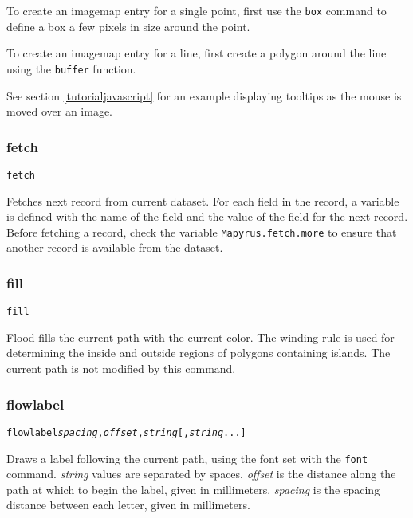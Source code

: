 To create an imagemap entry for a single point, first use the \texttt{box}
command to define a box a few pixels in size around the point.

To create an imagemap entry for a line, first create a polygon
around the line using the \texttt{buffer} function.

See section
\ref{tutorialjavascript}
for an example displaying tooltips as the mouse is moved over an image.

\subsubsection{fetch}

\begin{alltt}
fetch
\end{alltt}

Fetches next record from current dataset.
For each field in the record, a variable is defined with the name
of the field and the value of the field for the next record.
Before fetching a record, check the variable
\texttt{Mapyrus.fetch.more}
to ensure that another record is available from the dataset.

\subsubsection{fill}

\begin{alltt}
fill
\end{alltt}

Flood fills the current path with the current color.
The winding rule is used for determining the inside and outside
regions of polygons containing islands.
The current path is not modified by this command.

\subsubsection{flowlabel}

\begin{alltt}
flowlabel \textit{spacing}, \textit{offset}, \textit{string} [, \textit{string} ...]
\end{alltt}

Draws a label following the current path,
using the font set with the \texttt{font} command.
\textit{string} values are
separated by spaces.
\textit{offset} is the distance along the path at which to begin
the label, given in millimeters.
\textit{spacing} is the spacing distance
between each letter, given in millimeters.

